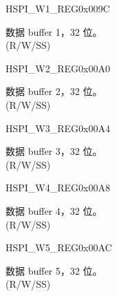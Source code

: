 \begin{register}{H}{SPI\_W1\_REG}{0x009C}\label{regdesc:SPI3W1REG}
%
\regnewline%
\begin{regdesc}\begin{reglist}
\label{fielddesc:SPI3BUF1}\item [SPI\_BUF1] 数据 buffer 1，32 位。\\
(R/W/SS)
\end{reglist}\end{regdesc}
\end{register}


\begin{register}{H}{SPI\_W2\_REG}{0x00A0}\label{regdesc:SPI3W2REG}
%
\regnewline%
\begin{regdesc}\begin{reglist}
\label{fielddesc:SPI3BUF2}\item [SPI\_BUF2] 数据 buffer 2，32 位。\\
(R/W/SS)
\end{reglist}\end{regdesc}
\end{register}


\begin{register}{H}{SPI\_W3\_REG}{0x00A4}\label{regdesc:SPI3W3REG}
%
\regnewline%
\begin{regdesc}\begin{reglist}
\label{fielddesc:SPI3BUF3}\item [SPI\_BUF3] 数据 buffer 3，32 位。\\
(R/W/SS)
\end{reglist}\end{regdesc}
\end{register}


\begin{register}{H}{SPI\_W4\_REG}{0x00A8}\label{regdesc:SPI3W4REG}
%
\regnewline%
\begin{regdesc}\begin{reglist}
\label{fielddesc:SPI3BUF4}\item [SPI\_BUF4] 数据 buffer 4，32 位。\\
(R/W/SS)
\end{reglist}\end{regdesc}
\end{register}


\begin{register}{H}{SPI\_W5\_REG}{0x00AC}\label{regdesc:SPI3W5REG}
%
\regnewline%
\begin{regdesc}\begin{reglist}
\label{fielddesc:SPI3BUF5}\item [SPI\_BUF5] 数据 buffer 5，32 位。\\
(R/W/SS)
\end{reglist}\end{regdesc}
\end{register}


